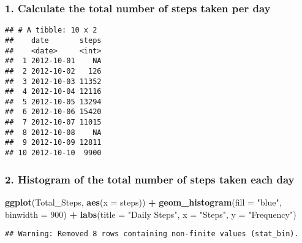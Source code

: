 \documentclass[]{article}
\newenvironment{Shaded}{\begin{snugshade}}{\end{snugshade}}
\newcommand{\KeywordTok}[1]{\textcolor[rgb]{0.13,0.29,0.53}{\textbf{#1}}}
\newcommand{\DataTypeTok}[1]{\textcolor[rgb]{0.13,0.29,0.53}{#1}}
\newcommand{\DecValTok}[1]{\textcolor[rgb]{0.00,0.00,0.81}{#1}}
\newcommand{\StringTok}[1]{\textcolor[rgb]{0.31,0.60,0.02}{#1}}
\newcommand{\OperatorTok}[1]{\textcolor[rgb]{0.81,0.36,0.00}{\textbf{#1}}}
\newcommand{\NormalTok}[1]{#1}
\begin{document}
\subsubsection{1. Calculate the total number of steps taken per
day}\label{calculate-the-total-number-of-steps-taken-per-day}

\begin{Shaded}
\end{Shaded}

\begin{verbatim}
## # A tibble: 10 x 2
##    date       steps
##    <date>     <int>
##  1 2012-10-01    NA
##  2 2012-10-02   126
##  3 2012-10-03 11352
##  4 2012-10-04 12116
##  5 2012-10-05 13294
##  6 2012-10-06 15420
##  7 2012-10-07 11015
##  8 2012-10-08    NA
##  9 2012-10-09 12811
## 10 2012-10-10  9900
\end{verbatim}

\subsubsection{2. Histogram of the total number of steps taken each
day}\label{histogram-of-the-total-number-of-steps-taken-each-day}

\begin{Shaded}
\begin{Highlighting}[]
\KeywordTok{ggplot}\NormalTok{(Total_Steps, }\KeywordTok{aes}\NormalTok{(}\DataTypeTok{x =}\NormalTok{ steps)) }\OperatorTok{+}
\StringTok{  }\KeywordTok{geom_histogram}\NormalTok{(}\DataTypeTok{fill =} \StringTok{"blue"}\NormalTok{, }\DataTypeTok{binwidth =} \DecValTok{900}\NormalTok{) }\OperatorTok{+}
\StringTok{  }\KeywordTok{labs}\NormalTok{(}\DataTypeTok{title =} \StringTok{"Daily Steps"}\NormalTok{, }\DataTypeTok{x =} \StringTok{"Steps"}\NormalTok{, }\DataTypeTok{y =} \StringTok{"Frequency"}\NormalTok{)}
\end{Highlighting}
\end{Shaded}

\begin{verbatim}
## Warning: Removed 8 rows containing non-finite values (stat_bin).
\end{verbatim}
\end{document}

